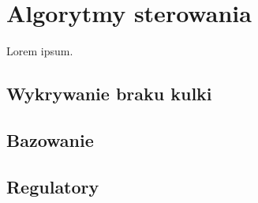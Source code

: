 \chapter{Algorytmy sterowania}
\label{cha:ch7_algorytmy_sterowania}

Lorem ipsum.



\section{Wykrywanie braku kulki}
\label{sec:ch7_wykrywanie_braku_kulki}


\section{Bazowanie}
\label{sec:ch7_bazowanie}


\section{Regulatory}
\label{sec:ch7_regulatory}


